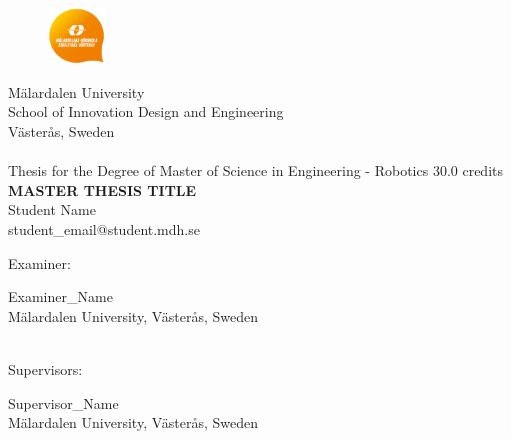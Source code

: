 
\begin{center}
		\begin{figure}[t]	
				\includegraphics[width=15mm, bb=0 0 100 100]{MDHlogga.png}
		\end{figure}
                 	\Large M\"{a}lardalen University \\
			\Large School of Innovation Design and Engineering \\
                        \Large V\"{a}ster\r{a}s, Sweden\\

                        \noindent\makebox[\linewidth]{\rule{\textwidth}{0.4pt}}\\[0.5cm]
                
                \Large{Thesis for the Degree of Master of Science in Engineering - Robotics 30.0 credits}\\[2.0cm]

			\huge \textbf{\uppercase{Master Thesis Title}} \\ [2.5cm] %
				
			\LARGE Student Name   \\	
        	\large student\_email@student.mdh.se \\[2.5cm]			

\begin{flushleft}
			\Large Examiner: \begin{minipage}[t]{0,7\textwidth}\Large Examiner\_Name\\\large M\"{a}lardalen University, \large V\"{a}ster\r{a}s, Sweden\\ \end{minipage}\\[0.5cm]
			
			\Large Supervisors: \begin{minipage}[t]{0,7\textwidth}\Large Supervisor\_Name\\\large M\"{a}lardalen University, \large V\"{a}ster\r{a}s, Sweden \end{minipage} \\[0.5cm]
			

\end{flushleft}
\end{center}
